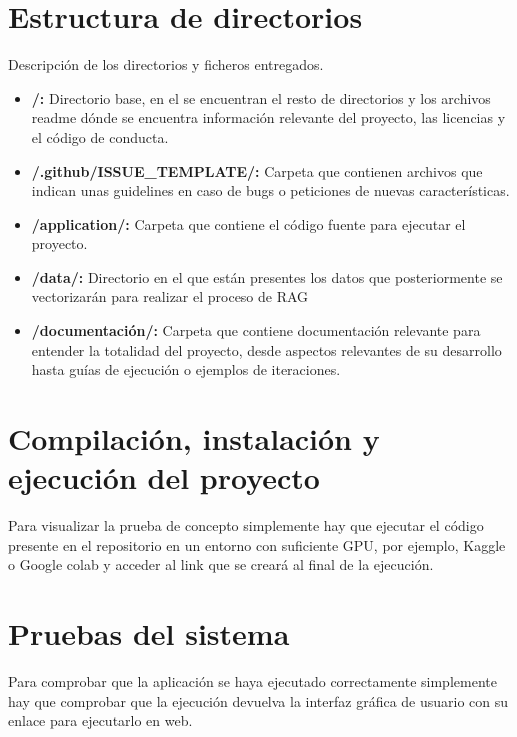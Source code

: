 

\section{Estructura de directorios}

Descripción de los directorios y ficheros entregados. 

\begin{itemize}
  \item \textbf{/:} Directorio base, en el se encuentran el resto de directorios 
 y los archivos readme dónde se encuentra información relevante del proyecto, las licencias y el código de conducta.
  
  \item \textbf{/.github/ISSUE\_TEMPLATE/:} Carpeta que contienen archivos que indican unas guidelines en caso de bugs o peticiones de nuevas características.

  \item \textbf{/application/:} Carpeta que contiene el código fuente para ejecutar el proyecto.
  
  \item \textbf{/data/:} Directorio en el que están presentes los datos que posteriormente se vectorizarán para realizar el proceso de RAG
  
  \item \textbf{/documentación/:} Carpeta que contiene documentación relevante para entender la totalidad del proyecto, desde aspectos relevantes de su desarrollo hasta guías de ejecución o ejemplos de iteraciones.

  
    
\end{itemize}

\section{Compilación, instalación y ejecución del proyecto}

Para visualizar la prueba de concepto simplemente hay que ejecutar el código presente en el repositorio en un entorno con suficiente GPU, por ejemplo, Kaggle o Google colab y acceder al link que se creará al final de la ejecución.


\section{Pruebas del sistema}

Para comprobar que la aplicación se haya ejecutado correctamente simplemente hay que comprobar que la ejecución devuelva la interfaz gráfica de usuario con su enlace para ejecutarlo en web.

